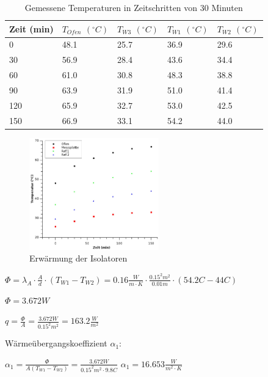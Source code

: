 \documentclass[12pt,a4paper,twopage]{article}
\begin{document}
\begin{table}
\begin{center}
\begin{tabular}{|l|l|l|l|l|}
\hline
Zeit (min) & $T_{Ofen}$ $(^\circ C)$ & $T_{W3}$ $(^\circ C)
$& $T_{W1}$ $(^\circ C)$ & $T_{W2}$ $(^\circ C)$\\
\hline
0 & 48.1 & 25.7 & 36.9 & 29.6\\
30 & 56.9 & 28.4 & 43.6 & 34.4\\
60 & 61.0 & 30.8 & 48.3 & 38.8\\
90 & 63.9 & 31.9 & 51.0 & 41.4\\
120 & 65.9 & 32.7 & 53.0 & 42.5\\
150 & 66.9 & 33.1 & 54.2 & 44.0\\
\hline
\end{tabular}
\caption{Gemessene Temperaturen in Zeitschritten von 30 Minuten}
\end{center}
\end{table}

\begin{figure}
\begin{center}
\includegraphics[width=0.5\textwidth]{isol.eps}
\caption{Erwärmung der Isolatoren}
\end{center}
\end{figure}

\( \Phi = \lambda_A \cdot \frac{A}{d} \cdot (T_{W1}-T_{W2}) = 0.16 \frac{W}{m\cdot K} \cdot \frac{0.15^2 m^2}{0.01m} \cdot (54.2 C - 44 C) \)

\( \boxed{ \Phi = 3.672 W }\) 

\( q = \frac{\Phi}{A} = \frac{3.672W}{0.15^2 m^2}=  \boxed{163.2 \frac{W}{m^2}} \)

Wärmeübergangskoeffizient $\alpha_1$:

\( \alpha_1 = \frac{\Phi}{A(T_{W1}-T_{W2})} = \frac{3.672W}{0.15^2 m^2 \cdot 9.8C} \) 
\( \alpha_1 = \boxed{16.653 \frac{W}{m^{2} \cdot K} } \)
\end{document}
